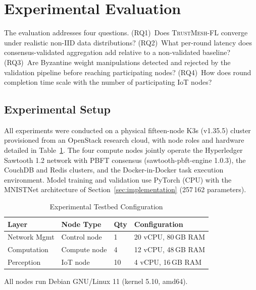 \documentclass[lettersize,journal]{IEEEtran}
\newcommand{\tmfl}{\textsc{TrustMesh-FL}}
\begin{document}
\section{Experimental Evaluation}
\label{sec:evaluation}

The evaluation addresses four questions. (RQ1)~Does \tmfl{} converge under realistic
non-IID data distributions? (RQ2)~What per-round latency does consensus-validated
aggregation add relative to a non-validated baseline? (RQ3)~Are Byzantine weight
manipulations detected and rejected by the validation pipeline before reaching
participating nodes? (RQ4)~How does round completion time scale with the number of
participating IoT nodes?

\subsection{Experimental Setup}
\label{sec:setup}

All experiments were conducted on a physical fifteen-node K3s (v1.35.5) cluster
provisioned from an OpenStack research cloud, with node roles and hardware detailed in
Table~\ref{tab:testbed}. The four compute nodes jointly operate the Hyperledger Sawtooth
1.2 network with PBFT consensus (sawtooth-pbft-engine 1.0.3), the CouchDB and Redis
clusters, and the Docker-in-Docker task execution environment. Model training and
validation use PyTorch (CPU) with the MNISTNet architecture of
Section~\ref{sec:implementation} (257\,162 parameters).

\begin{table}[t]
\centering
\caption{Experimental Testbed Configuration}
\label{tab:testbed}
\begin{tabular}{llll}
\toprule
Layer & Node Type & Qty & Configuration \\
\midrule
Network Mgmt & Control node & 1  & 20 vCPU, 80\,GB RAM \\
Computation  & Compute node & 4  & 12 vCPU, 48\,GB RAM \\
Perception   & IoT node     & 10 & 4 vCPU, 16\,GB RAM \\
\bottomrule
\end{tabular}
\vspace{2pt}

{\footnotesize All nodes run Debian GNU/Linux 11 (kernel 5.10, amd64).}
\end{table}
\end{document}
